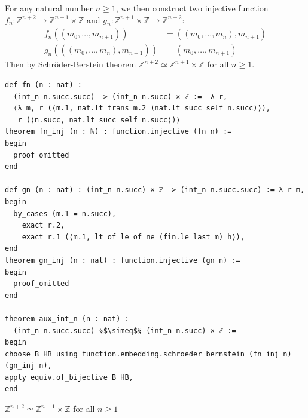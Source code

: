 \documentclass{report}
\theoremstyle{definition}
\newenvironment{code}{\captionsetup{type=listing}}{}
\begin{document}
For any natural number $n\ge 1$, we then construct two injective function $f_n : \mathbb{Z}^{n+2}\to\mathbb{Z}^{n+1}\times\mathbb{Z}$ and $g_n:\mathbb{Z}^{n+1}\times\mathbb{Z}\to\mathbb{Z}^{n+2}$:
\begin{equation*}
\begin{aligned}
f_n((m_0,\dots,m_{n+1}))&=((m_0,\dots,m_{n}),m_{n+1})\\
g_n(((m_0,\dots,m_{n}), m_{n+1}))&=(m_0,\dots,m_{n+1})
\end{aligned}
\end{equation*}
Then by Schr\"oder-Berstein theorem $\mathbb{Z}^{n+2}\simeq\mathbb{Z}^{n+1}\times\mathbb{Z}$ for all $n\ge 1$.
\begin{code}
\begin{verbatim}
def fn (n : nat) : 
  (int_n n.succ.succ) -> (int_n n.succ) × ℤ :=  λ r,
  ⟨λ m, r (⟨m.1, nat.lt_trans m.2 (nat.lt_succ_self n.succ)⟩), 
   r (⟨n.succ, nat.lt_succ_self n.succ⟩)⟩
theorem fn_inj (n : ℕ) : function.injective (fn n) :=
begin
  proof_omitted
end

def gn (n : nat) : (int_n n.succ) × ℤ -> (int_n n.succ.succ) := λ r m,
begin
  by_cases (m.1 = n.succ),
    exact r.2,
    exact r.1 (⟨m.1, lt_of_le_of_ne (fin.le_last m) h⟩),
end
theorem gn_inj (n : nat) : function.injective (gn n) :=
begin
  proof_omitted
end
  
theorem aux_int_n (n : nat) :
  (int_n n.succ.succ) §$\simeq$§ (int_n n.succ) × ℤ :=
begin
choose B HB using function.embedding.schroeder_bernstein (fn_inj n) (gn_inj n),
apply equiv.of_bijective B HB,
end
\end{verbatim}
\caption{$\mathbb{Z}^{n+2}\simeq\mathbb{Z}^{n+1}\times\mathbb{Z}$ for all $n\ge 1$}
\end{code}
\end{document}
